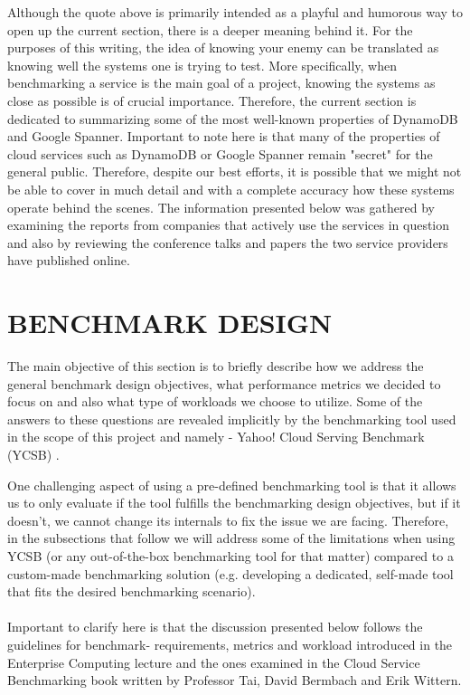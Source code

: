 \documentclass[letterpaper, 10 pt, conference]{ieeeconf}  %
\begin{document}
Although the quote above is primarily intended as a playful and humorous way to open up the current section, there is a deeper meaning behind it. For the purposes of this writing, the idea of knowing your enemy can be translated as knowing well the systems one is trying to test. More specifically, when benchmarking a service is the main goal of a project, knowing the systems as close as possible is of crucial importance. Therefore, the current section is dedicated to summarizing some of the most well-known properties of DynamoDB and Google Spanner. Important to note here is that many of the properties of cloud services such as DynamoDB or Google Spanner remain "secret" for the general public. Therefore, despite our best efforts, it is possible that we might not be able to cover in much detail and with a complete accuracy how these systems operate behind the scenes. The information presented below was gathered by examining the reports from companies that actively use the services in question and also by reviewing the conference talks and papers the two service providers have published online.

\section{BENCHMARK DESIGN}
The main objective of this section is to briefly describe how we address the general benchmark design objectives, what performance metrics we decided to focus on and also what type of workloads we choose to utilize. Some of the answers to these questions are revealed implicitly by the benchmarking tool used in the scope of this project and namely - Yahoo! Cloud
Serving Benchmark (YCSB) \cite{Cooper:2010:BCS:1807128.1807152}. \par One challenging aspect of using a pre-defined benchmarking tool is that it allows us to only evaluate if the tool fulfills the benchmarking design objectives, but if it doesn't, we cannot change its internals to fix the issue we are facing. Therefore, in the subsections that follow we will address some of the limitations when using YCSB (or any out-of-the-box benchmarking tool for that matter) compared to a custom-made benchmarking solution (e.g. developing a dedicated, self-made tool that fits the desired benchmarking scenario).  \\\\
Important to clarify here is that the discussion presented below follows the guidelines for benchmark- requirements, metrics and workload introduced in the Enterprise Computing lecture and the ones examined in the Cloud Service Benchmarking book \cite{StefanTaiBook} written by Professor Tai, David Bermbach and Erik Wittern.
\end{document}
